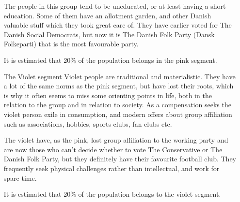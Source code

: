\begin{itemize}
The people in this group tend to be uneducated, or at least having a short education. Some of them have an allotment garden, and other Danish valuable stuff which they took great care of. They have earlier voted for The Danish Social Democrats, but now it is The Danish Folk Party (Dansk Folkeparti) that is the most favourable  party.

It is estimated that 20\% of the population belongs in the pink segment.

\item[The Violet segment]
Violet people are traditional and materialistic. They have a lot of the same norms as the pink segment, but have lost their roots, which is why it often seems to miss some orienting points in life, both in the relation to the group and in relation to society. As a compensation seeks the violet person exile in consumption, and modern offers about group affiliation such as associations, hobbies, sports clubs, fan clubs etc. 

The violet have, as the pink, lost group affiliation to the working party and are now those who can't decide whether to vote The Conservative or The Danish Folk Party, but they definitely have their favourite football club. They frequently seek physical challenges rather than intellectual, and work for spare time.

It is estimated that 20\% of the population belongs to the violet segment.
\end{itemize}

